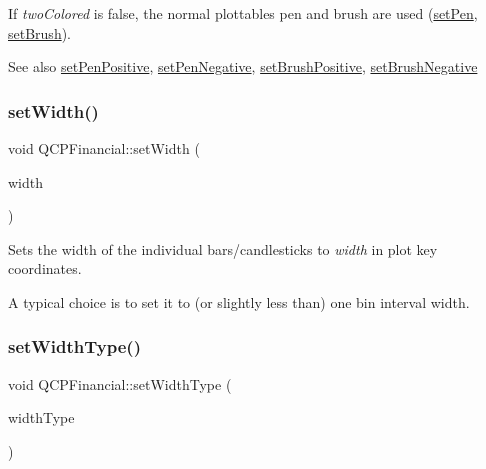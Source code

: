 If {\itshape two\+Colored} is false, the normal plottable\textquotesingle{}s pen and brush are used (\mbox{\hyperlink{class_q_c_p_abstract_plottable_ab74b09ae4c0e7e13142fe4b5bf46cac7}{set\+Pen}}, \mbox{\hyperlink{class_q_c_p_abstract_plottable_a7a4b92144dca6453a1f0f210e27edc74}{set\+Brush}}).

\begin{DoxySeeAlso}{See also}
\mbox{\hyperlink{class_q_c_p_financial_ac58aa3adc7a35aab0088764b840683e5}{set\+Pen\+Positive}}, \mbox{\hyperlink{class_q_c_p_financial_afe5c07e94ccea01a75b3a2476993c346}{set\+Pen\+Negative}}, \mbox{\hyperlink{class_q_c_p_financial_a5ebff2b1764efd07cc44942e67821829}{set\+Brush\+Positive}}, \mbox{\hyperlink{class_q_c_p_financial_a8bbdd87629f9144b3ef51af660c0961a}{set\+Brush\+Negative}} 
\end{DoxySeeAlso}
\mbox{\label{class_q_c_p_financial_a99633f8bac86a61d534ae5eeb1a3068f}} 
\subsubsection{\texorpdfstring{set\+Width()}{setWidth()}}
{\footnotesize\ttfamily void Q\+C\+P\+Financial\+::set\+Width (\begin{DoxyParamCaption}\item[{double}]{width }\end{DoxyParamCaption})}

Sets the width of the individual bars/candlesticks to {\itshape width} in plot key coordinates.

A typical choice is to set it to (or slightly less than) one bin interval width. \mbox{\label{class_q_c_p_financial_a204b7b710352796593a432b723e34089}} 
\subsubsection{\texorpdfstring{set\+Width\+Type()}{setWidthType()}}
{\footnotesize\ttfamily void Q\+C\+P\+Financial\+::set\+Width\+Type (\begin{DoxyParamCaption}\item[{\mbox{\hyperlink{class_q_c_p_financial_aef1761dda71a53dc5269685e9e492626}{Q\+C\+P\+Financial\+::\+Width\+Type}}}]{width\+Type }\end{DoxyParamCaption})}

